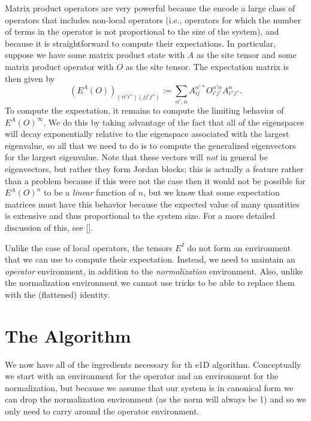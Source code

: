 \documentclass{article}
\begin{document}
Matrix product operators are very powerful because the encode a large class of operators that includes non-local operators (i.e., operators for which the number of terms in the operator is not proportional to the size of the system), and because it is straightforward to compute their expectations.  In particular, suppose we have some matrix product state with $A$ as the site tensor and some matrix product operator with $O$ as the site tensor.  The expectation matrix is then given by $$(E^A(O))_{(ii'i'')(jj'j'')} := \sum_{\alpha',\alpha} A^{\alpha'*}_{ij}O^{\alpha'\alpha}_{i'j'}A^{\alpha}_{i''j''}.$$  To compute the expectation, it remains to compute the limiting behavior of $E^A(O)^\infty$.  We do this by taking advantage of the fact that all of the eigenspaces will decay exponentially relative to the eigenspace associated with the largest eigenvalue, so all that we need to do is to compute the generalized eigenvectors for the largest eigenvalue.  Note that these vectors will \emph{not} in general be eigenvectors, but rather they form Jordan blocks;  this is actually a feature rather than a problem because if this were not the case then it would not be possible for $E^A(O)^n$ to be a \emph{linear} function of $n$, but we know that some expectation matrices must have this behavior because the expected value of many quantities is extensive and thus proportional to the system size.  For a more detailed discussion of this, see [].

Unlike the case of local operators, the tensors $E^I$ do not form an environment that we can use to compute their expectation.  Instead, we need to maintain an \emph{operator} environment, in addition to the \emph{normalization} environment.  Also, unlike the normalization environment we cannot use tricks to be able to replace them with the (flattened) identity.

\section{The Algorithm}

We now have all of the ingredients necessary for th e1D algorithm.  Conceptually we start with an environment for the operator and an environment for the normalization, but because we assume that our system is in canonical form we can drop the normalization environment (as the norm will always be 1) and so we only need to carry around the operator environment.
\end{document}
